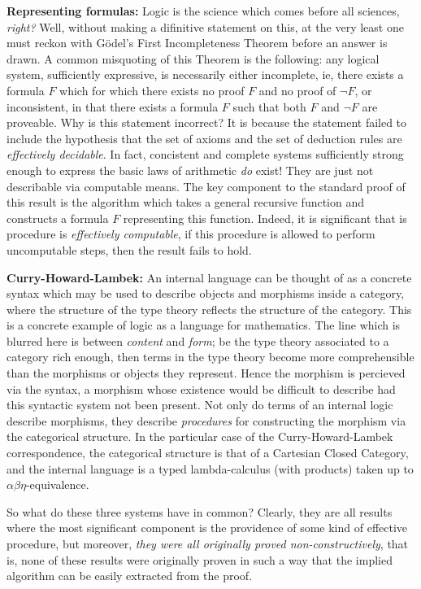\documentclass[12pt]{article}
\theoremstyle{plain}
\theoremstyle{definition}
\begin{document}
	\textbf{Representing formulas:} Logic is the science which comes before all sciences, \emph{right?} Well, without making a difinitive statement on this, at the very least one must reckon with G\"{o}del's First Incompleteness Theorem before an answer is drawn. A common misquoting of this Theorem is the following: any logical system, sufficiently expressive, is necessarily either incomplete, ie, there exists a formula $F$ which for which there exists no proof $F$ and no proof of $\neg F$, or inconsistent, in that there exists a formula $F$ such that both $F$ and $\neg F$ are proveable. Why is this statement incorrect? It is because the statement failed to include the hypothesis that the set of axioms and the set of deduction rules are \emph{effectively decidable}. In fact, concistent and complete systems sufficiently strong enough to express the basic laws of arithmetic \emph{do} exist! They are just not describable via computable means. The key component to the standard proof of this result is the algorithm which takes a general recursive function and constructs a formula $F$ representing this function. Indeed, it is significant that is procedure is \emph{effectively computable}, if this procedure is allowed to perform uncomputable steps, then the result fails to hold.
	
	\textbf{Curry-Howard-Lambek:} An internal language can be thought of as a concrete syntax which may be used to describe objects and morphisms inside a category, where the structure of the type theory reflects the structure of the category. This is a concrete example of logic as a language for mathematics. The line which is blurred here is between \emph{content} and \emph{form}; be the type theory associated to a category rich enough, then terms in the type theory become more comprehensible than the morphisms or objects they represent. Hence the morphism is percieved via the syntax, a morphism whose existence would be difficult to describe had this syntactic system not been present. Not only do terms of an internal logic describe morphisms, they describe \emph{procedures} for constructing the morphism via the categorical structure. In the particular case of the Curry-Howard-Lambek correspondence, the categorical structure is that of a Cartesian Closed Category, and the internal language is a typed lambda-calculus (with products) taken up to $\alpha\beta\eta$-equivalence.
	
	So what do these three systems have in common? Clearly, they are all results where the most significant component is the providence of some kind of effective procedure, but moreover, \emph{they were all originally proved non-constructively}, that is, none of these results were originally proven in such a way that the implied algorithm can be easily extracted from the proof.
	
\end{document}
